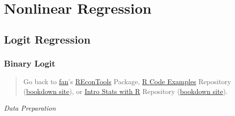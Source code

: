 \documentclass[
]{book}
\newenvironment{Shaded}{\begin{snugshade}}{\end{snugshade}}
\newcommand{\CommentTok}[1]{\textcolor[rgb]{0.56,0.35,0.01}{\textit{#1}}}
\newcommand{\DataTypeTok}[1]{\textcolor[rgb]{0.13,0.29,0.53}{#1}}
\newcommand{\DecValTok}[1]{\textcolor[rgb]{0.00,0.00,0.81}{#1}}
\newcommand{\ErrorTok}[1]{\textcolor[rgb]{0.64,0.00,0.00}{\textbf{#1}}}
\newcommand{\KeywordTok}[1]{\textcolor[rgb]{0.13,0.29,0.53}{\textbf{#1}}}
\newcommand{\NormalTok}[1]{#1}
\newcommand{\OperatorTok}[1]{\textcolor[rgb]{0.81,0.36,0.00}{\textbf{#1}}}
\newcommand{\OtherTok}[1]{\textcolor[rgb]{0.56,0.35,0.01}{#1}}
\newcommand{\StringTok}[1]{\textcolor[rgb]{0.31,0.60,0.02}{#1}}
\begin{document}
\hypertarget{nonlinear-regression}{%
\chapter{Nonlinear Regression}\label{nonlinear-regression}}

\hypertarget{logit-regression}{%
\section{Logit Regression}\label{logit-regression}}

\hypertarget{binary-logit}{%
\subsection{Binary Logit}\label{binary-logit}}

\begin{quote}
Go back to \href{http://fanwangecon.github.io/}{fan}'s \href{https://fanwangecon.github.io/REconTools/}{REconTools} Package, \href{https://fanwangecon.github.io/R4Econ/}{R Code Examples} Repository (\href{https://fanwangecon.github.io/R4Econ/bookdown}{bookdown site}), or \href{https://fanwangecon.github.io/Stat4Econ/}{Intro Stats with R} Repository (\href{https://fanwangecon.github.io/Stat4Econ/bookdown}{bookdown site}).
\end{quote}

\emph{Data Preparation}

\begin{Shaded}
\end{Shaded}
\end{document}
